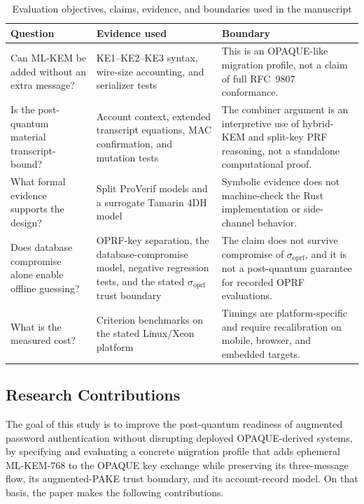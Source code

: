 \documentclass{ieeeijc}
\newcommand{\sigoprf}{\sigma_{\mathrm{oprf}}}
\theoremstyle{remark}
\begin{document}
\begin{table}[t]
\caption{Evaluation objectives, claims, evidence, and boundaries used in the manuscript}
\label{tab:objective-evidence}
\centering\scriptsize
\begin{tabularx}{\textwidth}{@{}L{3.2cm}L{5.2cm}X@{}}
\toprule
Question & Evidence used & Boundary \\
\midrule
Can ML-KEM be added without an extra message? & KE1--KE2--KE3 syntax,
wire-size accounting, and serializer tests & This is an OPAQUE-like
migration profile, not a claim of full RFC~9807 conformance. \\
Is the post-quantum material transcript-bound? & Account context,
extended transcript equations, MAC confirmation, and mutation tests &
The combiner argument is an interpretive use of hybrid-KEM and split-key PRF
reasoning, not a standalone computational proof. \\
What formal evidence supports the design? & Split ProVerif models and a
surrogate Tamarin 4DH model & Symbolic evidence does not machine-check the
Rust implementation or side-channel behavior. \\
Does database compromise alone enable offline guessing? & OPRF-key separation,
the database-compromise model, negative regression tests, and the stated
$\sigoprf$ trust boundary & The claim does not survive compromise of
$\sigoprf$, and it is not a post-quantum guarantee for recorded OPRF
evaluations. \\
What is the measured cost? & Criterion benchmarks on the stated Linux/Xeon
platform & Timings are platform-specific and require recalibration on mobile,
browser, and embedded targets. \\
\bottomrule
\end{tabularx}
\end{table}

\subsection{Research Contributions}

The goal of this study is to improve the post-quantum readiness of augmented
password authentication without disrupting deployed OPAQUE-derived systems, by
specifying and evaluating a concrete migration profile that adds ephemeral
ML-KEM-768 to the OPAQUE key exchange while preserving its three-message flow,
its augmented-PAKE trust boundary, and its account-record model. On that basis,
the paper makes the following contributions.
\end{document}
